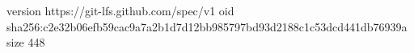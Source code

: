version https://git-lfs.github.com/spec/v1
oid sha256:c2e32b06efb59cac9a7a2b1d7d12bb985797bd93d2188c1c53dcd441db76939a
size 448
